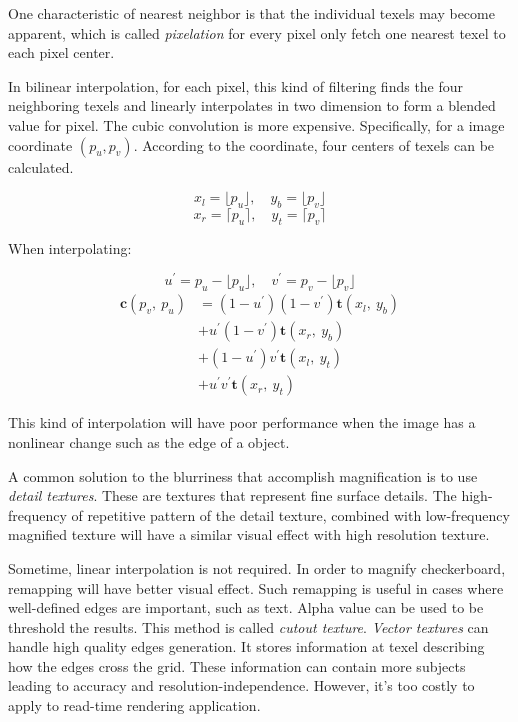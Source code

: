 \documentclass[10pt, a4paper]{article}
\begin{document}
    One characteristic of nearest neighbor is that the individual texels may become apparent, which is called \emph{pixelation} for every pixel only fetch one nearest texel to each pixel center. 

    In bilinear interpolation, for each pixel, this kind of filtering finds the four neighboring texels and linearly interpolates in two dimension to form a blended value for pixel. The cubic convolution is more expensive.  Specifically, for a image coordinate $(p_u, p_v)$. According to the coordinate, four centers of texels can be calculated.

    $$x_l = \lfloor p_u \rfloor, \quad y_b = \lfloor p_v \rfloor$$
    $$x_r = \lceil p_u \rceil, \quad y_t = \lceil  p_v \rceil$$

    When interpolating:

    $$u^{'} = p_u - \lfloor p_u \rfloor,\quad v^{'} = p_v - \lfloor p_v \rfloor$$
    \begin{align*}
        \textbf{c}(p_v,\ p_u) &= (1 - u^{'})(1 - v^{'})\textbf{t}(x_l,\ y_b) \\
            &+ u^{'}(1 - v^{'})\textbf{t}(x_r,\ y_b) \\
            &+ (1 - u^{'})v^{'}\textbf{t}(x_l,\ y_t) \\
            &+ u^{'}v^{'}\textbf{t}(x_r,\ y_t)
    \end{align*}

    This kind of interpolation will have poor performance when the image has a nonlinear change such as the edge of a object. 

    A common solution to the blurriness that accomplish magnification is to use \emph{detail textures}. These are textures that represent fine surface details. The high-frequency of repetitive pattern of the detail texture, combined with low-frequency magnified texture will have a similar visual effect with high resolution texture. 
    
    Sometime, linear interpolation is not required. In order to magnify checkerboard, remapping will have better visual effect. Such remapping is useful in cases where well-defined edges are important, such as text. Alpha value can be used to be threshold the results. This method is called \emph{cutout texture}. \emph{Vector textures} can handle high quality edges generation. It stores information at texel describing how the edges cross the grid. These information can contain more subjects leading to accuracy and resolution-independence. However, it's too costly to apply to read-time rendering application. 
    
\end{document}
